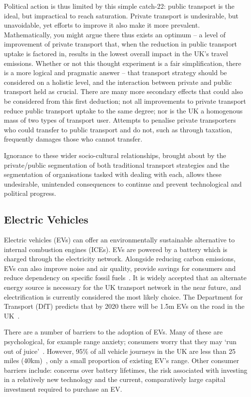 \documentclass[conference]{IEEEtran}
\begin{document}
Political action is thus limited by this simple catch-22: public
transport is the ideal, but impractical to reach saturation. Private
transport is undesirable, but unavoidable, yet efforts to improve it
also make it more prevalent. Mathematically, you might argue there
thus exists an optimum -- a level of improvement of private transport
that, when the reduction in public transport uptake is factored in,
results in the lowest overall impact in the UK's travel
emissions. Whether or not this thought experiment is a fair
simplification, there is a more logical and pragmatic answer -- that
transport strategy should be considered on a holistic level, and the
interaction between private and public transport held as
crucial. There are many more secondary effects that could also be
considered from this first deduction; not all improvements to private
transport reduce public transport uptake to the same degree; nor is
the UK a homogenous mass of two types of transport user. Attempts to
penalise private transporters who could transfer to public transport
and do not, such as through taxation, frequently damages those who
cannot transfer.

Ignorance to these wider socio-cultural relationships, brought about
by the private/public segmentation of both traditional transport
strategies and the segmentation of organisations tasked with dealing
with each, allows these undesirable, unintended consequences to
continue and prevent technological and political progress.

\subsection{Electric Vehicles}

Electric vehicles (EVs) can offer an environmentally sustainable
alternative to internal combustion engines (ICEs). EVs are powered by
a battery which is charged through the electricity network. Alongside
reducing carbon emissions, EVs can also improve noise and air quality,
provide savings for consumers and reduce dependency on specific fossil
fuels~\cite{postevs:2010}. It is widely accepted that an alternate
energy source is necessary for the UK transport network in the near
future, and electrification is currently considered the most likely
choice.  The Department for Transport (DfT) predicts that by 2020
there will be 1.5m EVs on the road in the UK~\cite{dft:2008}.

There are a number of barriers to the adoption of EVs. Many of these
are psychological, for example range anxiety; consumers worry that
they may `run out of juice'~\cite{oflev:2011}. However, 95\% of all
vehicle journeys in the UK are less than 25 miles
(40km)~\cite{oflev:2011}, only a small proportion of existing EV's
range. Other consumer barriers include: concerns over battery
lifetimes, the risk associated with investing in a relatively new
technology and the current, comparatively large capital investment
required to purchase an EV.
\end{document}
